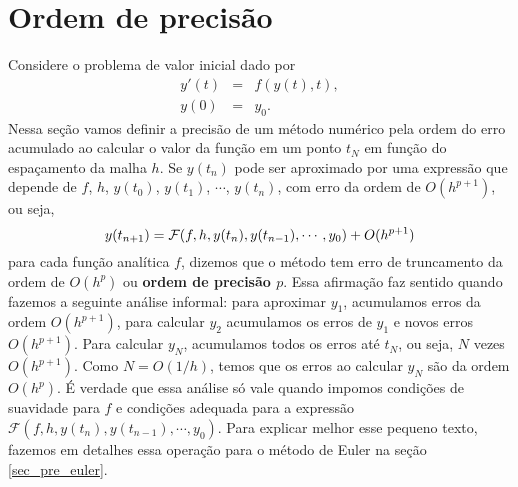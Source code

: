 \section{Ordem de precisão}
Considere o problema de valor inicial dado por
\begin{eqnarray*}
y'(t)&=&f(y(t),t),\\
y(0)&=&y_0.
\end{eqnarray*}
Nessa seção vamos definir a precisão de um método numérico pela ordem do erro acumulado ao calcular o valor da função em um ponto $t_N$ em função do espaçamento da malha $h$. Se $y(t_n)$ pode ser aproximado por uma expressão que depende de $f$, $h$, $y(t_0)$, $y(t_1)$, $\cdots$, $y(t_n)$, com erro da ordem de $O(h^{p+1})$, ou seja,
\begin{equation}{\label{erro_local_1}}
y(t_{n+1})=\mathcal{F}(f, h, y(t_n), y(t_{n-1}), \cdots, y_0) + O(h^{p+1})
\end{equation}
para cada função analítica $f$, dizemos que o método tem erro de truncamento da ordem de $O(h^{p})$ ou {\bf ordem de precisão $p$}. Essa afirmação faz sentido quando fazemos a seguinte análise informal: para aproximar $y_1$, acumulamos erros da ordem $O(h^{p+1})$, para calcular $y_2$ acumulamos os erros de $y_1$ e novos erros $O(h^{p+1})$. Para calcular $y_N$, acumulamos todos os erros até $t_N$, ou seja, $N$ vezes $O(h^{p+1})$. Como $N=O(1/h)$, temos que os erros ao calcular $y_N$ são da ordem $O(h^p)$. É verdade que essa análise só vale quando impomos condições de suavidade para $f$ e condições adequada para a expressão $\mathcal{F}(f, h, y(t_n), y(t_{n-1}), \cdots, y_0)$. Para explicar melhor esse pequeno texto, fazemos em detalhes essa operação para o método de Euler na seção \ref{sec_pre_euler}.


